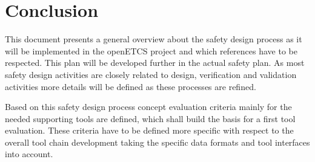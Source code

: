 \documentclass{template/openetcs_article}
\begin{document}
\section{Conclusion}

This document presents a general overview about the safety design process as it will be implemented in the openETCS project and which references have to be respected. This plan will be developed further in the actual safety plan. As most safety design activities are closely related to design, verification and validation activities more details will be defined as these processes are refined.

Based on this safety design process concept evaluation criteria mainly for the needed supporting tools are defined, which shall build the basis for a first tool evaluation. These criteria have to be defined more specific with respect to the overall tool chain development taking the specific data formats and tool interfaces into account.

\nocite{*} 






\end{document}
